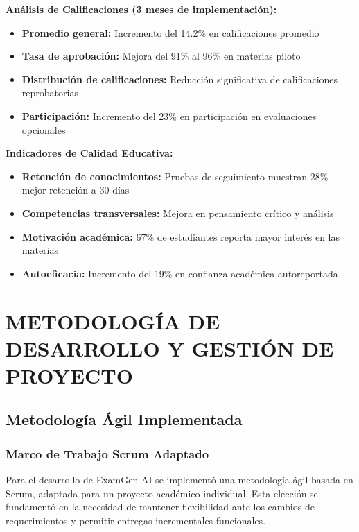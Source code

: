 \documentclass[12pt,a4paper]{report}
\begin{document}
\textbf{Análisis de Calificaciones (3 meses de implementación):}
\begin{itemize}
\item \textbf{Promedio general:} Incremento del 14.2\% en calificaciones promedio
\item \textbf{Tasa de aprobación:} Mejora del 91\% al 96\% en materias piloto
\item \textbf{Distribución de calificaciones:} Reducción significativa de calificaciones reprobatorias
\item \textbf{Participación:} Incremento del 23\% en participación en evaluaciones opcionales
\end{itemize}

\textbf{Indicadores de Calidad Educativa:}
\begin{itemize}
\item \textbf{Retención de conocimientos:} Pruebas de seguimiento muestran 28\% mejor retención a 30 días
\item \textbf{Competencias transversales:} Mejora en pensamiento crítico y análisis
\item \textbf{Motivación académica:} 67\% de estudiantes reporta mayor interés en las materias
\item \textbf{Autoeficacia:} Incremento del 19\% en confianza académica autoreportada
\end{itemize}

\chapter{METODOLOGÍA DE DESARROLLO Y GESTIÓN DE PROYECTO}

\section{Metodología Ágil Implementada}

\subsection{Marco de Trabajo Scrum Adaptado}

Para el desarrollo de ExamGen AI se implementó una metodología ágil basada en Scrum, adaptada para un proyecto académico individual. Esta elección se fundamentó en la necesidad de mantener flexibilidad ante los cambios de requerimientos y permitir entregas incrementales funcionales.
\end{document}
